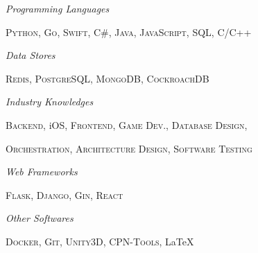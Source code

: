 \documentclass[paper=a4,fontsize=11pt]{scrartcl} %
\newlength{\spacebox}
\newcommand{\sepspace}{\vspace*{1em}}        %
\newcommand{\PersonalEntry}[2]{
        \noindent\hangindent=2em\hangafter=0 %
        \parbox{\spacebox}{        %
        \textit{#1}}               %
        \hspace{1.5em} #2 \par}    %
\newcommand{\SkillsEntry}[2]{      %
        \noindent\hangafter=0 %
        \parbox{6em}{        %
        \textit{#1}}               %
        \hspace{1.5em} #2 \par}    %
\begin{document}
\SkillsEntry{Programming Languages}{\textsc{Python},  \textsc{Go}, \textsc{Swift}, \textsc{C\#}, \textsc{Java}, \textsc{JavaScript}, \textsc{SQL}, \textsc{C/C++}}
\sepspace

\SkillsEntry{Data Stores}{\textsc{Redis}, \textsc{PostgreSQL}, \textsc{MongoDB}, \textsc{CockroachDB}}
\sepspace

\SkillsEntry{Industry Knowledges}{\textsc{Backend}, iOS, \textsc{Frontend}, \textsc{Game Dev.}, \textsc{Database Design},}
\SkillsEntry{}{\textsc{Orchestration}, \textsc{Architecture Design}, \textsc{Software Testing}}
\sepspace

\SkillsEntry{Web \newline Frameworks}{\textsc{Flask}, \textsc{Django}, \textsc{Gin}, \textsc{React}}
\sepspace

\SkillsEntry{Other \newline Softwares}{\textsc{Docker}, \textsc{Git}, \textsc{Unity3D}, \textsc{CPN-Tools},  \LaTeX}
\sepspace
\end{document}
